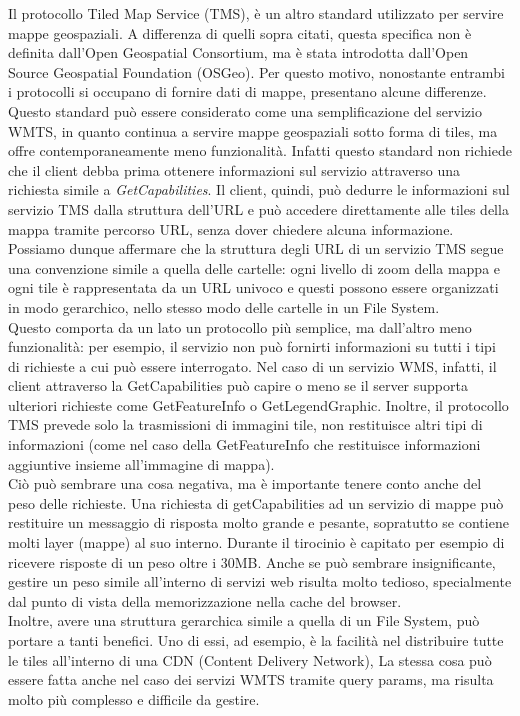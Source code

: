 Il protocollo Tiled Map Service (TMS), è un altro standard utilizzato per servire mappe geospaziali. A differenza di quelli sopra citati, questa specifica non è definita dall'Open Geospatial Consortium, ma è stata introdotta dall'Open Source Geospatial Foundation (OSGeo). Per questo motivo, nonostante entrambi i protocolli si occupano di fornire dati di mappe, presentano alcune differenze.
\\Questo standard può essere considerato come una semplificazione del servizio WMTS, in quanto continua a servire mappe geospaziali sotto forma di tiles, ma offre contemporaneamente meno funzionalità.
Infatti questo standard non richiede che il client debba prima ottenere informazioni sul servizio attraverso una richiesta simile a  \textit{GetCapabilities}. Il client, quindi, può dedurre le informazioni sul servizio TMS dalla struttura dell'URL e può accedere direttamente alle tiles della mappa tramite percorso URL, senza dover chiedere alcuna informazione.
Possiamo dunque affermare che la struttura degli URL di un servizio TMS segue una convenzione simile a quella delle cartelle: ogni livello di zoom della mappa e ogni tile è rappresentata da un URL univoco e questi possono essere organizzati in modo gerarchico, nello stesso modo delle cartelle in un File System.
\\Questo comporta da un lato un protocollo più semplice, ma dall'altro meno funzionalità: per esempio, il servizio non può fornirti informazioni su tutti i tipi di richieste a cui può essere interrogato. Nel caso di un servizio WMS, infatti, il client attraverso la GetCapabilities può capire o meno se il server supporta ulteriori richieste come GetFeatureInfo o GetLegendGraphic.
Inoltre, il protocollo TMS prevede solo la trasmissioni di immagini tile, non restituisce altri tipi di informazioni (come nel caso della GetFeatureInfo che restituisce informazioni aggiuntive insieme all'immagine di mappa).
\\Ciò può sembrare una cosa negativa, ma è importante tenere conto anche del peso delle richieste. Una richiesta di getCapabilities ad un servizio di mappe può restituire un messaggio di risposta molto grande e pesante, sopratutto se contiene molti layer (mappe) al suo interno. Durante il tirocinio è capitato per esempio di ricevere risposte di un peso oltre i 30MB. Anche se può sembrare insignificante, gestire un peso simile all'interno di servizi web risulta molto tedioso, specialmente dal punto di vista della memorizzazione nella cache del browser.
\\Inoltre, avere una struttura gerarchica simile a quella di un File System, può portare a tanti benefici. Uno di essi, ad esempio, è la facilità nel distribuire tutte le tiles all'interno di una CDN (Content Delivery Network), La stessa cosa può essere fatta anche nel caso dei servizi WMTS tramite query params, ma risulta molto più complesso e difficile da gestire.
